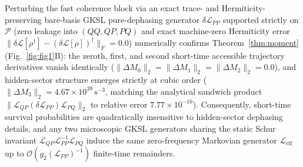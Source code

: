\documentclass[10pt,letterpaper]{article}
\theoremstyle{plain}
\theoremstyle{definition}
\newcommand{\Lcal}{\mathcal{L}}
\newcommand{\Pcal}{\mathcal{P}}
\begin{document}
Perturbing the fast coherence block via an exact trace- and Hermiticity-preserving bare-basis GKSL pure-dephasing generator $\delta\Lcal_{PP}$ supported strictly on $\Pcal$ (zero leakage into $(QQ, QP, PQ)$ and exact machine-zero Hermiticity error $\|\delta\Lcal[\rho^\dagger] - (\delta\Lcal[\rho])^\dagger\|_F = 0.0$) numerically confirms Theorem~\ref{thm:moment} (Fig.~\ref{fig:fig1}B): the zeroth, first, and second short-time accessible trajectory derivatives vanish identically ($\|\Delta M_0\|_2 = \|\Delta M_1\|_2 = \|\Delta M_2\|_2 = 0.0$), and hidden-sector structure emerges strictly at cubic order ($\|\Delta M_3\|_2 = 4.67 \times 10^{39}\,\mathrm{s}^{-3}$, matching the analytical sandwich product $\|\Lcal_{QP}(\delta\Lcal_{PP})\Lcal_{PQ}\|_2$ to relative error $7.77 \times 10^{-16}$). Consequently, short-time survival probabilities are quadratically insensitive to hidden-sector dephasing details, and any two microscopic GKSL generators sharing the static Schur invariant $\Lcal_{QP}\Lcal_{PP}^{-1}\Lcal_{PQ}$ induce the same zero-frequency Markovian generator $\Lcal_{\mathrm{eff}}$ up to $\mathcal{O}(g_2(\Lcal_{PP})^{-1})$ finite-time remainders.
\end{document}
